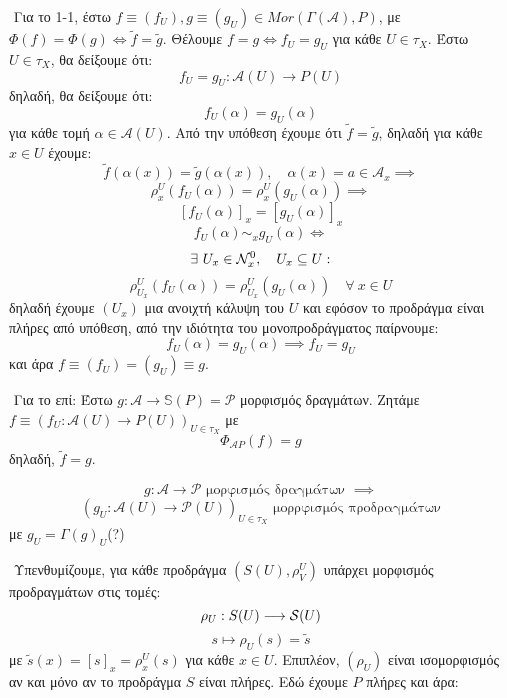$ $\newline
Για το 1-1, έστω $f\equiv(f_U), g\equiv (g_U) \in Mor(\Gamma(\mathcal{A}),P)$, με $\Phi(f) = \Phi(g) \iff \tilde{f} = \tilde{g}$. Θέλουμε $f=g \iff f_U = g_U$ για κάθε $U \in \tau_X$. Έστω $U \in \tau_X$, θα δείξουμε ότι:
$$f_U = g_U :\mathcal{A}(U) \longrightarrow P(U)$$ δηλαδή, θα δείξουμε ότι:
$$f_U(\alpha) = g_U(\alpha)$$ για κάθε τομή $\alpha \in \mathcal{A}(U)$. Από την υπόθεση έχουμε ότι $\tilde{f} = \tilde{g}$, δηλαδή για κάθε $x \in U$ έχουμε:
$$\tilde{f}(\alpha(x)) = \tilde{g}(\alpha(x)), \quad \alpha(x) = a \in \mathcal{A}_x \implies $$
$$\rho^U_x(f_U(\alpha)) = \rho^U_x(g_U(\alpha)) \implies $$
$$[f_U(\alpha)]_x = [g_U(\alpha)]_x $$
$$f_U(\alpha) \sim_x g_U(\alpha) \iff $$
$$\exists \ U_x \in \mathcal{N}^0_x, \quad U_x \subseteq U:$$
$$\rho^U_{U_x}(f_U(\alpha)) = \rho^U_{U_x}(g_U(\alpha)) \quad \forall \ x \in U$$ δηλαδή έχουμε $(U_x)$ μια ανοιχτή κάλυψη του $U$ και εφόσον το προδράγμα είναι πλήρες από υπόθεση, από την ιδιότητα του μονοπροδράγματος παίρνουμε:
$$f_U(\alpha) = g_U(\alpha) \implies f_U = g_U$$ και άρα $f\equiv (f_U) = (g_U) \equiv g$.


$ $\newline
Για το επί: Έστω $g:\mathcal{A}\longrightarrow \mathbb{S}(P)=\mathcal{P}$ μορφισμός δραγμάτων. Ζητάμε $f\equiv(f_U:\mathcal{A}(U)\longrightarrow P(U))_{U\in\tau_X}$ με 
$$\Phi_{\mathcal{A}P}(f)=g $$ δηλαδή, $\tilde{f} = g$.

$$g: \mathcal{A} \longrightarrow \mathcal{P} \text{ μορφισμός δραγμάτων } \implies $$
$$(g_U: \mathcal{A}(U) \longrightarrow \mathcal{P}(U))_{U \in \tau_X} \text{ μορρφισμός προδραγμάτων}$$ με $g_U = \Gamma(g)_U$(?)

$ $\newline
Υπενθυμίζουμε, για κάθε προδράγμα $(S(U),\rho^U_V)$ υπάρχει μορφισμός προδραγμάτων στις τομές:
$$\rho_U: S(U)\longrightarrow \mathcal{S} (U)$$
$$s\longmapsto \rho_U(s) = \tilde{s}$$ με $\tilde{s}(x) = [s]_x = \rho^U_x(s)$ για κάθε $x \in U$. Επιπλέον, $(\rho_U)$ είναι ισομορφισμός αν και μόνο αν το προδράγμα $S$ είναι πλήρες. Εδώ έχουμε $P$ πλήρες και άρα:

\begin{figure}[H]
    \centering
\end{figure}

